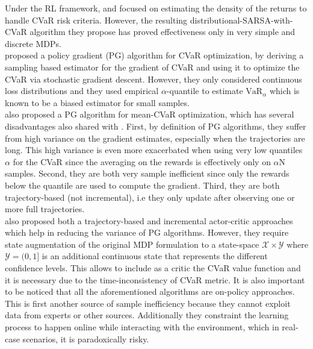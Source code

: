 Under the RL framework, \citet{Morimura2010a} and \citet{Morimura2010b}
focused on estimating the density of the returns
to handle CVaR risk criteria. However, the resulting distributional-SARSA-with-CVaR algorithm
they propose has  proved  effectiveness  only  in  very  simple  and discrete MDPs.\\
\citet{Tamar2015a} proposed a policy gradient (PG) algorithm for CVaR optimization, by
deriving a sampling based estimator for the gradient of CVaR and using it to optimize the
CVaR via stochastic gradient descent. However, they only considered continuous loss distributions
and they used empirical $\alpha$-quantile to estimate 
$\text{VaR}_\alpha$ which is known to be a biased estimator for small samples.\\
\citet{Chow2014} also proposed a PG algorithm for mean-CVaR optimization, which has several
disadvantages also shared with \citet{Tamar2015}. First, by definition of PG algorithms,
they suffer from high variance on the gradient estimates, especially when the trajectories
are long. This high variance is even more exacerbated when using very low quantiles $\alpha$ for the CVaR 
since the averaging on the rewards is effectively only on $\alpha$N samples.
Second, they are both very sample inefficient since only the rewards below the quantile
are used to compute the gradient. Third, they are both trajectory-based (not incremental), 
i.e they only update after observing one or more full trajectories.\\
\citet{Chow2014} also proposed both a trajectory-based and incremental actor-critic
approaches which help in reducing the variance of PG algorithms. However, they require
state augmentation of the original MDP formulation to a state-space
$\mathcal{X} \times \mathcal{Y}$ where $\mathcal{Y} = (0,1]$ is an additional continuous
state that represents the different confidence levels. 
This allows to include as a critic the CVaR value function and it is necessary due to 
the time-inconsistency of CVaR metric.
It is also important to be noticed that all the aforementioned algorithms are on-policy approaches.
This is first another source of sample inefficiency
because they cannot exploit data from experts or other sources. Additionally they
constraint the learning process to happen online while interacting with the environment,
which in real-case scenarios, it is paradoxically risky.

